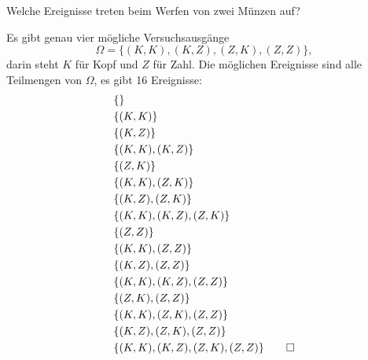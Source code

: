 Welche Ereignisse treten beim Werfen von zwei Münzen auf?

\begin{loesung}
Es gibt genau vier mögliche Versuchsausgänge
\[
\Omega=\{
(K,K),
(K,Z),
(Z,K),
(Z,Z)\},
\]
darin steht  $K$ für Kopf und $Z$ für Zahl.
Die möglichen Ereignisse sind alle Teilmengen von $\Omega$, es
gibt 16 Ereignisse:
\begin{align*}
&\{                           \}\\
&\{(K,K)                      \}\\
&\{       (K,Z)               \}\\
&\{(K,K), (K,Z)               \}\\
&\{              (Z,K)        \}\\
&\{(K,K),        (Z,K)        \}\\
&\{       (K,Z), (Z,K)        \}\\
&\{(K,K), (K,Z), (Z,K)        \}\\
&\{                     (Z,Z) \}\\
&\{(K,K),               (Z,Z) \}\\
&\{       (K,Z),        (Z,Z) \}\\
&\{(K,K), (K,Z),        (Z,Z) \}\\
&\{              (Z,K), (Z,Z) \}\\
&\{(K,K),        (Z,K), (Z,Z) \}\\
&\{       (K,Z), (Z,K), (Z,Z) \}\\
&\{(K,K), (K,Z), (Z,K), (Z,Z) \}
\qedhere
\end{align*}
\end{loesung}

